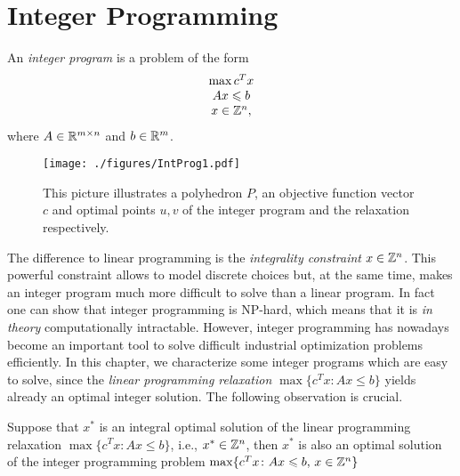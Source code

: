 \chapter{Integer Programming}
\label{sec:integer-programming}

An \emph{integer program} is a problem of the form 
\begin{displaymath}
  \begin{array}{c}
    \max c^Tx \\
    Ax\leqslant b \\
    x \in \mathbb{Z}^n,
  \end{array}
\end{displaymath}
where $A \in \mathbb{R}^{m\times n}$ and $b \in \mathbb{R}^m$. 


 

\begin{figure}[htbp]
  \begin{center}
   \texttt{[image: ./figures/IntProg1.pdf]}
\label{fig:inthull}
  \end{center}
  \caption{This picture illustrates a polyhedron $P$, an objective
    function vector $c$ and optimal points $u,v$ of the integer
    program and the relaxation respectively. }
\end{figure}



The difference to linear programming is the \emph{integrality
  constraint} $x \in \mathbb{Z}^n$. This powerful constraint allows to
model discrete choices but, at the same time, makes an integer program
much more difficult to solve than a linear program. In fact one can
show that integer programming is NP-hard, which means that it is
\emph{in theory} computationally intractable. However, integer
programming has nowadays become an important tool to solve difficult
industrial optimization problems efficiently. In this chapter, we
characterize some integer programs which are easy to solve, since the
\emph{linear programming relaxation} $\max\{c^Tx \colon Ax\leq b\}$
yields already an optimal integer solution. The following observation
is crucial.

\begin{theorem}
  \label{thr:14}
  Suppose that   $x^*$ is an integral  optimal solution of the  
  linear programming 
  relaxation $\max\{c^Tx \colon Ax\leq b\}$, i.e., $x^* \in
  \mathbb{Z}^n$, then $x^*$ is also an optimal solution of the integer
  programming problem $\max\{c^Tx \colon Ax\leqslant b, \, x \in \mathbb{Z}^n\}$
\end{theorem}

